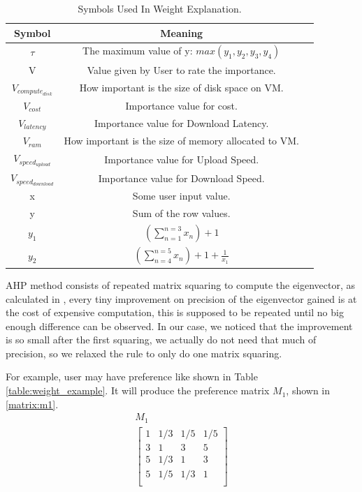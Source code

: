 \begin{table}[!ht]
\begin{center}\caption{Symbols Used In Weight Explanation.} \label{table:weight_explanation_symbols}
\begin{tabular}{|c|c|c|}
\hline
\textbf{Symbol }&  \textbf{Meaning } \\
\hline $\tau $ & The maximum value of y: $ max(y_{1},y_{2},y_{3},y_{4}) $ \\
\hline V & Value given by User to rate the importance. \\
\hline $V_{compute_{disk}}$ & How important is the size of disk space on VM. \\
\hline $V_{cost}$ & Importance value for cost. \\
\hline ${V_{latency}}$ & Importance value for Download Latency. \\
\hline $V_{ram}$ & How important is the size of memory allocated to VM. \\
\hline $V_{speed_{upload}}$ & Importance value for Upload Speed. \\
\hline $V_{speed_{download}}$ & Importance value for Download Speed. \\
\hline x & Some user input value. \\
\hline y & Sum of the row values. \\
\hline ${y_1}$ & $\left( {\sum\limits_{n = 1}^{n = 3} {{x_n}} } \right) + 1$ \\
\hline ${y_2}$ & $\left( {\sum\limits_{n = 4}^{n = 5} {{x_n}} } \right) + 1 + \frac{1}{{{x_1}}}$\\
\hline
\end{tabular}
\end{center}
\end{table}

AHP method consists of repeated matrix squaring to compute the eigenvector, as calculated in , every tiny improvement on precision of the eigenvector gained is at the cost of expensive computation, this is supposed to be repeated until no big enough difference can be observed. In our case, we noticed that the improvement is so small after the first squaring, we actually do not need that much of precision, so we relaxed the rule to only do one matrix squaring.

For example, user may have preference like shown in Table \ref{table:weight_example}. It will produce the preference matrix $M_1$, shown in \eqref{matrix:m1}.
\begin{equation}\label{matrix:m1}
\begin{array}{c}
    M_1\\
    \begin{bmatrix}
        1 & 1/3 & 1/5 & 1/5 \\
        3 & 1   & 3   & 5 \\
        5 & 1/3 & 1   & 3 \\
        5 & 1/5 & 1/3 & 1\\
    \end{bmatrix}
\end{array}
\end{equation}

